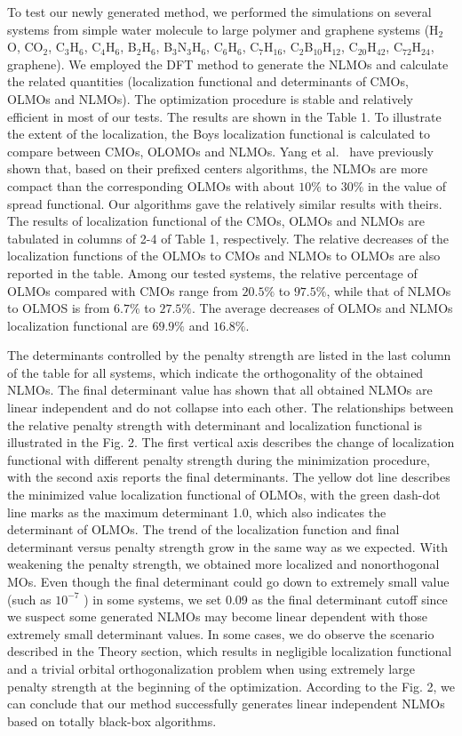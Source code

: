 \documentclass[aps,prl,reprint,amsmath,amssymb]{revtex4-1}
\begin{document}
To test our newly generated method, we performed the simulations on several systems from simple water molecule to large polymer and graphene systems (H$_2$O, CO$_2$, C$_3$H$_6$, C$_4$H$_6$, B$_2$H$_6$, B$_3$N$_3$H$_6$, C$_6$H$_6$, C$_7$H$_{16}$, C$_2$B$_{10}$H$_{12}$, C$_{20}$H$_{42}$, C$_{72}$H$_{24}$, graphene).
We employed the DFT method to generate the NLMOs and calculate the related quantities (localization functional and determinants of CMOs, OLMOs and NLMOs).
The optimization procedure is stable and relatively efficient in most of our tests.
The results are shown in the Table 1.
To illustrate the extent of the localization,  the Boys localization functional is calculated to compare between CMOs, OLOMOs and NLMOs.
Yang et al.~\cite{feng2004An_efficient, cui2010efficient} have previously shown that, based on their prefixed centers algorithms, the NLMOs are more compact than the corresponding OLMOs with about $10\%$ to $30\%$ in the value of spread functional.
Our algorithms gave the relatively similar results with theirs.
The results of localization functional of the CMOs, OLMOs and NLMOs are tabulated in columns of 2-4 of Table 1, respectively.
The relative decreases of the localization functions of the OLMOs to CMOs and NLMOs to OLMOs are also reported in the table.
Among our tested systems, the relative percentage of OLMOs compared with CMOs range from $20.5\%$ to $97.5\%$, while that of NLMOs to OLMOS is from $6.7\%$ to $27.5\%$.
The average decreases of OLMOs and NLMOs localization functional are $69.9\%$ and $16.8\%$.

The determinants controlled by the penalty strength are listed in the last column of the table for all systems, which indicate the orthogonality of the obtained NLMOs.
The final determinant value has shown that all obtained NLMOs are linear independent and do not collapse into each other.
The relationships between the relative penalty strength with determinant and localization functional is illustrated in the Fig. 2.
The first vertical axis describes the change of localization functional with different penalty strength during the minimization procedure, with the second axis reports the final determinants.
The yellow dot line describes the minimized value localization functional of OLMOs, with the green dash-dot line marks as the maximum determinant 1.0, which also indicates the determinant of OLMOs.
The trend of the localization function and final determinant versus penalty strength grow in the same way as we expected.
With weakening the penalty strength, we obtained more localized and nonorthogonal MOs.
Even though the final determinant could go down to extremely small value (such as $10^{-7}$ ) in some systems, we set 0.09 as the final determinant cutoff since we suspect some generated NLMOs may become linear dependent with those extremely small determinant values.
In some cases, we do observe the scenario described in the Theory section, which results in negligible localization functional and a trivial orbital orthogonalization problem when using extremely large penalty strength at the beginning of the optimization.
According to the Fig. 2, we can conclude that our method successfully generates linear independent NLMOs based on totally black-box algorithms.
\end{document}
